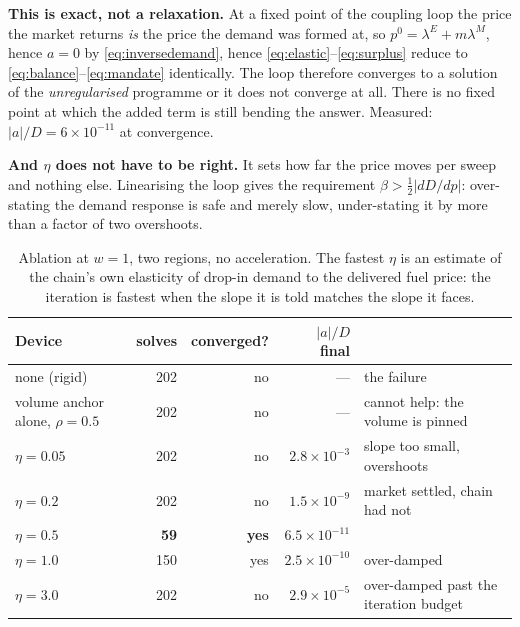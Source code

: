 \documentclass[11pt,a4paper]{article}
\begin{document}
\begin{keybox}
\textbf{This is exact, not a relaxation.} At a fixed point of the coupling loop the price
the market returns \emph{is} the price the demand was formed at, so $p^{0} = \lambda^{E}
+ m\lambda^{M}$, hence $a = 0$ by \eqref{eq:inversedemand}, hence
\eqref{eq:elastic}--\eqref{eq:surplus} reduce to \eqref{eq:balance}--\eqref{eq:mandate}
identically. The loop therefore converges to a solution of the \emph{unregularised}
programme or it does not converge at all. There is no fixed point at which the added term
is still bending the answer. Measured: $|a|/D = 6\times10^{-11}$ at convergence.

\textbf{And $\eta$ does not have to be right.} It sets how far the price moves per sweep
and nothing else. Linearising the loop gives the requirement $\beta > \tfrac12|dD/dp|$:
over-stating the demand response is safe and merely slow, under-stating it by more than a
factor of two overshoots.
\end{keybox}

\begin{table}[h]
\centering\small
\begin{tabular}{@{}lrrrl@{}}
\toprule
\textbf{Device} & \textbf{solves} & \textbf{converged?} & \textbf{$|a|/D$ final} & \\
\midrule
none (rigid) & 202 & no & --- & the failure \\
volume anchor alone, $\rho=0.5$ & 202 & no & --- & cannot help: the volume is pinned \\
$\eta = 0.05$ & 202 & no & $2.8\times10^{-3}$ & slope too small, overshoots \\
$\eta = 0.2$ & 202 & no & $1.5\times10^{-9}$ & market settled, chain had not \\
$\eta = 0.5$ & \textbf{59} & \textbf{yes} & $6.5\times10^{-11}$ & \\
$\eta = 1.0$ & 150 & yes & $2.5\times10^{-10}$ & over-damped \\
$\eta = 3.0$ & 202 & no & $2.9\times10^{-5}$ & over-damped past the iteration budget \\
\bottomrule
\end{tabular}
\caption{Ablation at $w=1$, two regions, no acceleration. The fastest $\eta$ is an
estimate of the chain's own elasticity of drop-in demand to the delivered fuel price:
the iteration is fastest when the slope it is told matches the slope it faces.}
\label{tab:ablation}
\end{table}
\end{document}
